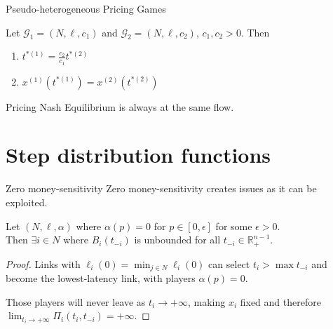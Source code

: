 \documentclass[handout]{beamer}
\newcommand{\R}{\mathbb{R}}
\newcommand{\Gm}{\mathcal{G}}
\begin{document}
\begin{frame}{Pseudo-heterogeneous Pricing Games}
	\begin{lemma}
		Let $\Gm_1 = (N, \ell, c_1)$ and $\Gm_2 = (N, \ell, c_2)$, $c_1, c_2 > 0$.
		Then
		\begin{enumerate}[$(i)$]
			\item $t^{*(1)} = \frac{c_2}{c_1} t^{*(2)}$
			\item $x^{(1)}(t^{*(1)}) = x^{(2)}(t^{*(2)})$
		\end{enumerate}
	\end{lemma}
	Pricing Nash Equilibrium is always at the same flow.
\end{frame}

\section{Step distribution functions}

\begin{frame}{Zero money-sensitivity}
	Zero money-sensitivity creates issues as it can be exploited.
	\begin{lemma}
		Let $(N, \ell, \alpha)$ where $\alpha(p) = 0$ for $p \in [0, \epsilon]$ for some $\epsilon > 0$.\\
		Then $\exists i \in N$ where $B_i(t_{-i})$ is unbounded for all $t_{-i} \in \R_+^{n - 1}$.
	\end{lemma}\pause
	\begin{proof}
		Links with $\ell_i(0) = \min_{j \in N} \ell_i(0)$ can select $t_i > \max t_{-i}$ and become the lowest-latency link, with players $\alpha(p) = 0$.

		Those players will never leave as $t_i \rightarrow +\infty$, making $x_i$ fixed and therefore $\lim_{t_i \rightarrow +\infty} \Pi_i(t_i, t_{-i}) = +\infty$.
	\end{proof}
\end{frame}
\end{document}
